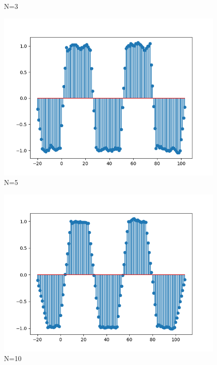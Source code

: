 \documentclass[10pt,a4paper, margin=1in]{article}
\begin{document}
\begin{enumerate}
\begin{enumerate}
\begin{figure}[H]
        \caption{N=3}
    \end{figure}
    \begin{figure}[H]
        \includegraphics[scale=0.75]{7b_2.png}
        \caption{N=5}
    \end{figure}
    \begin{figure}[H]
        \includegraphics[scale=0.75]{7b_3.png}
        \caption{N=10}
    \end{figure}
    \begin{figure}[H]

\end{figure}
\end{enumerate}
\end{enumerate}
\end{document}
